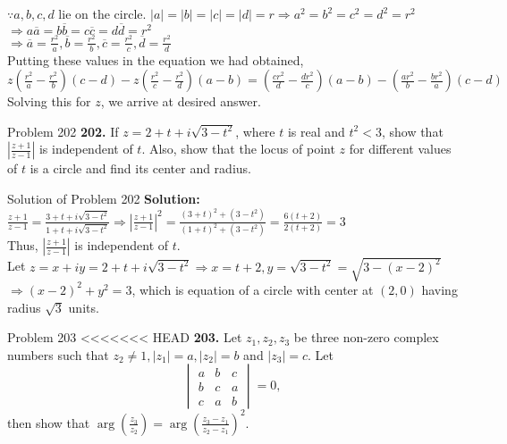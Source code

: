 \documentclass[aspectratio=169,8pt]{beamer}
\begin{document}
\begin{frame}
  $\because a, b, c, d$ lie on the circle. $|a| = |b| = |c| = |d| = r \Rightarrow a^2 = b^2 = c^2 = d^2 = r^2$\\
  \vspace*{0.2cm}
  $\Rightarrow a\overline{a} = b\overline{b} = c\overline{c} = d\overline{d} = r^2$\\
  \vspace*{0.2cm}
  $\Rightarrow \overline{a} = \frac{r^2}{a}, \overline{b} = \frac{r^2}{b}, \overline{c} = \frac{r^2}{c}, \overline{d} =
  \frac{r^2}{d}$\\
  \vspace*{0.2cm}
  Putting these values in the equation we had obtained,
  $z\left(\frac{r^2}{a} - \frac{r^2}{b}\right)(c - d) - z\left(\frac{r^2}{c} - \frac{r^2}{d}\right)(a - b) = \left(\frac{cr^2}{d} -
  \frac{dr^2}{c}\right)(a - b) - \left(\frac{ar^2}{b} - \frac{br^2}{a}\right)(c - d)$\\
  \vspace*{0.2cm}
  Solving this for $z$, we arrive at desired answer.
\end{frame}
\begin{frame}{Problem 202}
  \textbf{202.} If $z = 2 + t + i\sqrt{3 - t^2}$, where $t$ is real and $t^2 < 3$, show that $\left|\frac{z + 1}{z - 1}\right|$ is
  independent of $t$. Also, show that the locus of point $z$ for different values of $t$ is a circle and find its center and
  radius.
\end{frame}
\begin{frame}{Solution of Problem 202}
  \textbf{Solution:} $\frac{z + 1}{z - 1} = \frac{3 + t + i\sqrt{3 - t^2}}{1 + t + i\sqrt{3 - t^2}} \Rightarrow \left|\frac{z +
    1}{z - 1}\right|^2 = \frac{(3 + t)^2 + (3 - t^2)}{(1 + t)^2 + (3 - t^2)} = \frac{6(t + 2)}{2(t + 2)} = 3$\\
  \vspace*{0.2cm}
  Thus, $\left|\frac{z + 1}{z - 1}\right|$ is independent of $t$.\\
  \vspace*{0.2cm}
  Let $z = x + iy = 2 + t + i\sqrt{3 - t^2} \Rightarrow x = t + 2, y = \sqrt{3 - t^2} = \sqrt{3 - (x - 2)^2}$\\
  \vspace*{0.2cm}
  $\Rightarrow (x - 2)^2 + y^2 = 3$, which is equation of a circle with center at $(2,  0)$ having radius $\sqrt{3}$ units.
\end{frame}
\begin{frame}{Problem 203}
<<<<<<< HEAD
  \textbf{203.} Let $z_1, z_2, z_3$ be three non-zero complex numbers such that $z_2 \ne 1, |z_1| = a, |z_2| = b$ and $|z_3| =
  c$. Let $$\begin{vmatrix}a & b & c\\b & c & a\\c & a & b\end{vmatrix} = 0,$$
    then show that $\arg\left(\frac{z_3}{z_2}\right) = \arg\left(\frac{z_3 - z_1}{z_2 - z_1}\right)^2$.
\end{frame}
\end{document}
